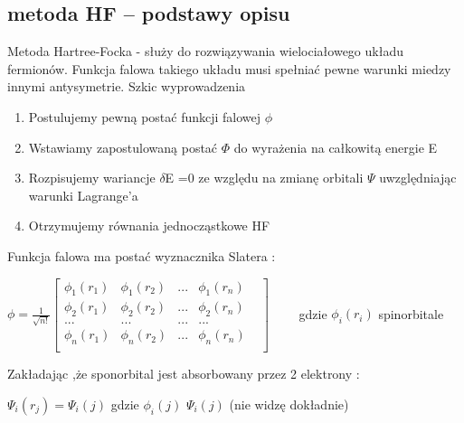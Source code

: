 \documentclass{article}
\begin{document}
					\subsection{metoda HF – podstawy opisu}
					Metoda Hartree-Focka - służy do rozwiązywania wielociałowego układu fermionów. Funkcja falowa takiego układu musi spełniać pewne warunki miedzy innymi antysymetrie.\newline
					Szkic wyprowadzenia\newline
					\begin{enumerate}
						\item Postulujemy pewną postać funkcji falowej $\phi$
						\item Wstawiamy zapostulowaną postać $\Phi$ do wyrażenia na całkowitą energie E
						\item Rozpisujemy wariancje $\delta$E =0 ze względu na zmianę orbitali $\Psi$ uwzględniając warunki Lagrange'a
						\item Otrzymujemy równania jednocząstkowe HF
					\end{enumerate}
					Funkcja falowa ma postać wyznacznika Slatera :
					
					$\phi =\frac{1}{\sqrt{n!}} \left[
					\begin{array}{ccccc}
					\phi_{1}(r_{1}) & \phi_{1}(r_{2}) &... &\phi_{1}(r_{n}) &\\
					\phi_{2}(r_{1}) & \phi_{2}(r_{2}) &... &\phi_{2}(r_{n}) &\\
					...             &     ...         &... &...           &\\
					\phi_{n}(r_{1}) & \phi_{n}(r_{2}) &... &\phi_{n}(r_{n}) &\\
					\end{array}
					\right]
					\qquad 
					$	
					gdzie $\phi_{i}(r_{i})$ spinorbitale \newline
					
					Zakładając ,że sponorbital jest absorbowany przez 2 elektrony :\newline
					\begin{center}
						$\Psi_{i}(r_{j})=\Psi_{i}(j) $ gdzie $\phi_{i}(j)$ $\Psi_{i}(j)$ (nie widzę dokładnie)
					\end{center}
					
\end{document}
